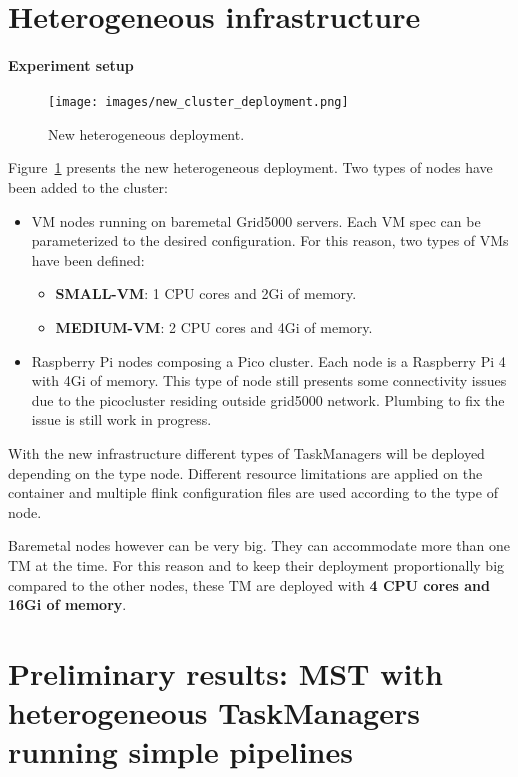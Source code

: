 \documentclass{article}
\begin{document}
\section{Heterogeneous infrastructure}
\paragraph{Experiment setup}
\begin{figure}[h]
	\centering
	\texttt{[image: images/new\_cluster\_deployment.png]}
	\caption{New heterogeneous deployment.}
    \label{fig:heterogeneous_deployment}
\end{figure}

Figure~\ref{fig:heterogeneous_deployment} presents the new heterogeneous deployment. Two types of nodes have been added to the cluster:
\begin{itemize}
    \item VM nodes running on baremetal Grid5000 servers.
    Each VM spec can be parameterized to the desired configuration. For this reason, two types of VMs have been defined:
    \begin{itemize}
        \item \textbf{SMALL-VM}: 1 CPU cores and 2Gi of memory.
        \item \textbf{MEDIUM-VM}: 2 CPU cores and 4Gi of memory.
    \end{itemize}
    \item Raspberry Pi nodes composing a Pico cluster.
    Each node is a Raspberry Pi 4 with 4Gi of memory.
    This type of node still presents some connectivity issues due to the picocluster residing outside grid5000 network. Plumbing to fix the issue is still work in progress.
\end{itemize}

With the new infrastructure different types of TaskManagers will be deployed depending on the type node. Different resource limitations are applied on the container and multiple flink configuration files are used according to the type of node.

Baremetal nodes however can be very big. They can accommodate more than one TM at the time. For this reason and to keep their deployment proportionally big compared to the other nodes, these TM are deployed with \textbf{4 CPU cores and 16Gi of memory}.
\newpage
\section{Preliminary results: MST with heterogeneous TaskManagers running simple pipelines}
\end{document}
